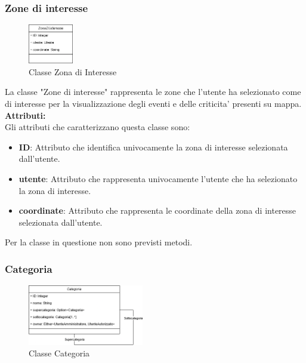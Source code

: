 \documentclass{article}
\begin{document}
\clearpage

\subsubsection{Zone di interesse}

\begin{figure}[htbp]
    \centering
    \includegraphics[width=0.175\textwidth]{Images/zona_class.png}
    \caption{Classe Zona di Interesse}
    \label{fig:zona}
\end{figure}

La classe "Zone di interesse" rappresenta le zone che l'utente ha selezionato come di interesse per la visualizzazione degli eventi e delle criticita' presenti su mappa.\\

\textbf{Attributi:}\\
Gli attributi che caratterizzano questa classe sono:
\begin{itemize}
    \item \textbf{ID}: Attributo che identifica univocamente la zona di interesse selezionata dall'utente.
    \item \textbf{utente}: Attributo che rappresenta univocamente l'utente che ha selezionato la zona di interesse.
    \item \textbf{coordinate}: Attributo che rappresenta le coordinate della zona di interesse selezionata dall'utente.\\
\end{itemize}
Per la classe in questione non sono previsti metodi.

\subsubsection{Categoria}

\begin{figure}[htbp]
    \centering
    \includegraphics[width=0.45\textwidth]{Images/categoria_class.png}
    \caption{Classe Categoria}
    \label{fig:categoria}
\end{figure}
\end{document}
